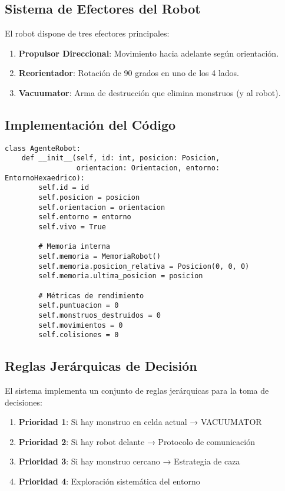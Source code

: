 \documentclass[10pt,twocolumn]{article}
\begin{document}
\subsection{Sistema de Efectores del Robot}

El robot dispone de tres efectores principales:

\begin{enumerate}
\item \textbf{Propulsor Direccional}: Movimiento hacia adelante según orientación.
\item \textbf{Reorientador}: Rotación de 90 grados en uno de los 4 lados.
\item \textbf{Vacuumator}: Arma de destrucción que elimina monstruos (y al robot).
\end{enumerate}

\subsection{Implementación del Código}

\begin{lstlisting}[caption=Clase Principal del Agente Robot, label=lst:robot_agent]
class AgenteRobot:
    def __init__(self, id: int, posicion: Posicion, 
                 orientacion: Orientacion, entorno: EntornoHexaedrico):
        self.id = id
        self.posicion = posicion
        self.orientacion = orientacion
        self.entorno = entorno
        self.vivo = True
        
        # Memoria interna
        self.memoria = MemoriaRobot()
        self.memoria.posicion_relativa = Posicion(0, 0, 0)
        self.memoria.ultima_posicion = posicion
        
        # Métricas de rendimiento
        self.puntuacion = 0
        self.monstruos_destruidos = 0
        self.movimientos = 0
        self.colisiones = 0
\end{lstlisting}

\subsection{Reglas Jerárquicas de Decisión}

El sistema implementa un conjunto de reglas jerárquicas para la toma de decisiones:

\begin{enumerate}
\item \textbf{Prioridad 1}: Si hay monstruo en celda actual → VACUUMATOR
\item \textbf{Prioridad 2}: Si hay robot delante → Protocolo de comunicación
\item \textbf{Prioridad 3}: Si hay monstruo cercano → Estrategia de caza
\item \textbf{Prioridad 4}: Exploración sistemática del entorno
\end{enumerate}
\end{document}
